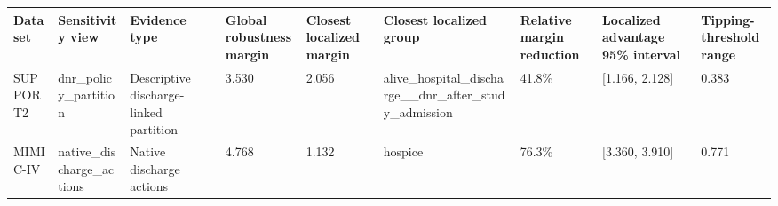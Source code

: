\begin{tabular}{lllllllll}
\toprule
Dataset & Sensitivity view & Evidence type & Global robustness margin & Closest localized margin & Closest localized group & Relative margin reduction & Localized advantage 95\% interval & Tipping-threshold range \\
\midrule
SUPPORT2 & dnr\_policy\_partition & Descriptive discharge-linked partition & 3.530 & 2.056 & alive\_hospital\_discharge\_\_dnr\_after\_study\_admission & 41.8\% & [1.166, 2.128] & 0.383 \\
MIMIC-IV & native\_discharge\_actions & Native discharge actions & 4.768 & 1.132 & hospice & 76.3\% & [3.360, 3.910] & 0.771 \\
\bottomrule
\end{tabular}
